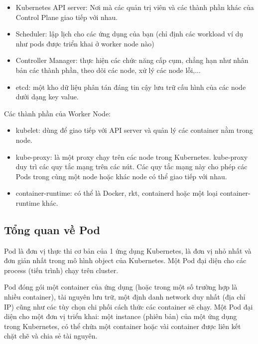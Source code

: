 \documentclass[14pt,a4paper]{book}
\begin{document}
				\begin{itemize}				
					\item Kubernetes API server: Nơi mà các quản trị viên và các thành phần khác của Control Plane giao tiếp với nhau.
					\item Scheduler: lập lịch cho các ứng dụng của bạn (chỉ định các workload ví dụ như pods được triển khai ở worker node nào)
					\item  Controller Manager: thực hiện các chức năng cấp cụm, chẳng hạn như nhân bản các thành phần, theo dõi các node, xử lý các node lỗi,...
					\item etcd: một kho dữ liệu phân tán đáng tin cậy lưu trữ cấu hình của các node dưới dạng key value.
				\end{itemize}
			
				{\hspace{0.3cm}Các thành phần của Worker Node:\\}
				
				\begin{itemize}				
					\item kubelet: dùng để giao tiếp với API server và quản lý các container nằm trong node.
					\item kube-proxy: là một proxy chạy trên các node trong  Kubernetes. kube-proxy duy trì các quy tắc mạng trên các nút. Các quy tắc mạng này cho phép các Pods trong cùng một node hoặc khác node có thể giao tiếp với nhau.
					\item container-runtime: có thể là Docker, rkt, containerd hoặc một loại container-runtime khác.
				\end{itemize}
			
			\subsection{Tổng quan về Pod}
				{\hspace{0.6cm}Pod là đơn vị thực thi cơ bản của 1 ứng dụng Kubernetes, là đơn vị nhỏ nhất và đơn giản nhất trong mô hình object của Kubernetes. Một Pod đại diện cho các process (tiến trình) chạy trên cluster.\\}
				
				Pod đóng gói một container của ứng dụng (hoặc trong một số trường hợp là nhiều container), tài nguyên lưu trữ, một định danh network duy nhất (địa chỉ IP) cũng như các tùy chọn chi phối cách thức các container sẽ chạy. Một Pod đại diện cho một đơn vị triển khai: một instance (phiên bản) của một ứng dụng trong Kubernetes, có thể chứa một container hoặc vài container được liên kết chặt chẽ và chia sẻ tài nguyên.\\
				
\end{document}
